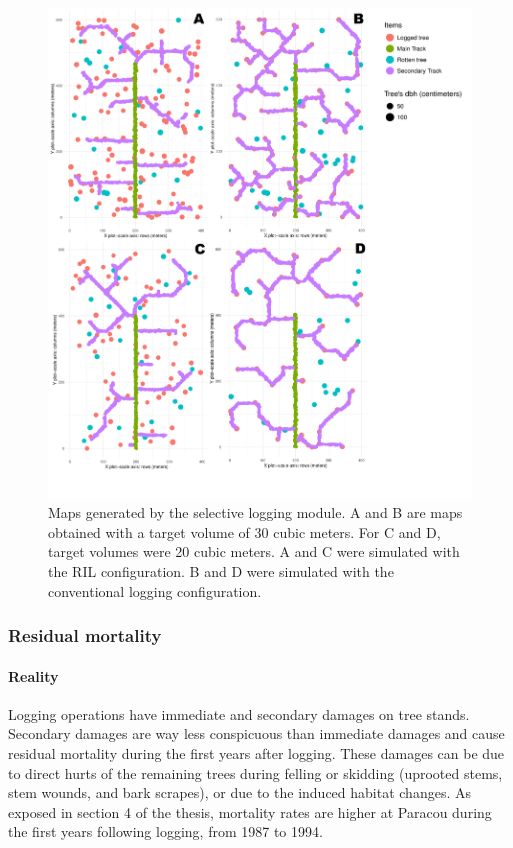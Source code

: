 \documentclass[12pt,]{article}
\theoremstyle{definition}
\theoremstyle{definition}
\theoremstyle{definition}
\theoremstyle{remark}
\begin{document}
\begin{figure}
\centering
\includegraphics{images/logging_fig.png}
\caption{\label{fig:tracksRIL}Maps generated by the selective logging
module. A and B are maps obtained with a target volume of 30 cubic
meters. For C and D, target volumes were 20 cubic meters. A and C were
simulated with the RIL configuration. B and D were simulated with the
conventional logging configuration.}
\end{figure}

\subsubsection{Residual mortality}\label{residual-mortality}

\paragraph{Reality}\label{reality-5}

Logging operations have immediate and secondary damages on tree stands.
Secondary damages are way less conspicuous than immediate damages and
cause residual mortality during the first years after logging. These
damages can be due to direct hurts of the remaining trees during felling
or skidding (uprooted stems, stem wounds, and bark scrapes), or due to
the induced habitat changes. As exposed in section 4 of the thesis,
mortality rates are higher at Paracou during the first years following
logging, from 1987 to 1994.
\end{document}
